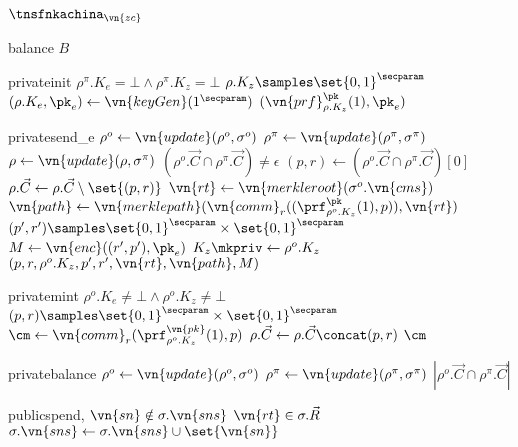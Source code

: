 \begin{transitionfn}{$\tnsfnkachina_{\vn{zc}}$}
  \begin{receiveinput}{balance}{}
    \State \mkpriv {}
    \State \mknorm \Return $B$
  \end{receiveinput}
  \vsep
  \mkpriv
  \begin{receivequery}{private}{init}{}
    \State \Assert $\rho^\pi.K_e = \bot \land \rho^\pi.K_z = \bot$
    \State \Let $\rho.K_z \samples \set{0, 1}^\secparam$
    \State \Let $(\rho.K_e, \pk_e) \gets \vn{keyGen}(1^\secparam)$
    \State \Return $(\vn{prf}_{\rho.K_z}^{\pk}(1), \pk_e)$
  \end{receivequery}
  
  \begin{receivequery}{private}{send}{\pk_e}
    \State \Let $\rho^o \gets \vn{update}(\rho^o, \sigma^o)$
    \State \Let $\rho^\pi \gets \vn{update}(\rho^\pi, \sigma^\pi)$
    \State \Let $\rho \gets \vn{update}(\rho, \sigma^\pi)$
    \State \Assert $(\rho^o.\vec{C} \cap \rho^\pi.\vec{C}) \neq \epsilon$
    \State \Let $(p, r) \gets (\rho^o.\vec{C} \cap \rho^\pi.\vec{C})[0]$
    \State \Let $\rho.\vec{C} \gets \rho.\vec{C} \setminus \set{(p, r)}$
    \State \Let $\vn{rt} \gets \vn{merkleroot}(\sigma^o.\vn{cms})$
    \State \Let $\vn{path} \gets
      \vn{merklepath}(\vn{comm}_r((\prf_{\rho^o.K_z}^{\pk}(1), p)),
      \vn{rt})$
    \State \Let $(p', r') \samples \set{0,1}^\secparam \times \set{0,1}^\secparam$
    \State \Let $M \gets \vn{enc}((r', p'), \pk_e)$
    \State \Let $K_z \mkpriv \gets \rho^o.K_z$
    \State \Return $(p, r, \rho^o.K_z, p', r', \vn{rt}, \vn{path}, M)$
  \end{receivequery}
  
  \begin{receivequery}{private}{mint}{}
    \State \Assert $\rho^o.K_e \neq \bot \land \rho^o.K_z \neq \bot$
    \State \Let $(p, r) \samples \set{0,1}^\secparam \times \set{0,1}^\secparam$
    \State \Let $\cm \gets
      \vn{comm}_r(\prf^{\vn{pk}}_{\rho^o.K_z}(1), p)$
    \State \Let $\rho.\vec{C} \gets \rho.\vec{C} \concat (p, r)$
    \State \Return $\cm$
  \end{receivequery}

  \begin{receivequery}{private}{balance}{}
    \State \Let $\rho^o \gets \vn{update}(\rho^o, \sigma^o)$
    \State \Let $\rho^\pi \gets \vn{update}(\rho^\pi, \sigma^\pi)$
    \State \Return $|\rho^o.\vec{C} \cap \rho^\pi.\vec{C}|$
  \end{receivequery}
  \mknorm
  \vsep
  \mkpub
  \begin{receivequery}{public}{spend}{, }
    \State \Assert $\vn{sn} \notin \sigma.\vn{sns}$
    \State \Assert $\vn{rt} \in \sigma.\vec{R}$
    \State \Let $\sigma.\vn{sns} \gets \sigma.\vn{sns} \cup \set{\vn{sn}}$
  \end{receivequery}


\end{transitionfn}
